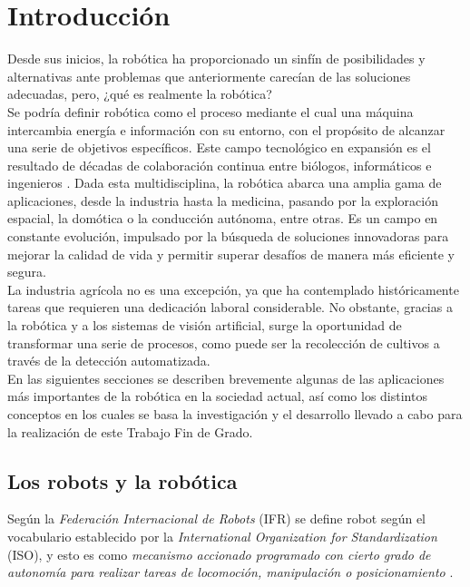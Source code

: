 \chapter{Introducción}
\label{cap:capitulo1}
\setcounter{page}{1}

Desde sus inicios, la robótica ha proporcionado un sinfín de posibilidades y alternativas ante problemas que anteriormente carecían de las soluciones adecuadas, pero, ¿qué es realmente la robótica?\\

Se podría definir robótica como el proceso mediante el cual una máquina intercambia energía e información con su entorno, con el propósito de alcanzar una serie de objetivos específicos. Este campo tecnológico en expansión es el resultado de décadas de colaboración continua entre biólogos, informáticos e ingenieros \cite{Koditschek21}. Dada esta multidisciplina, la robótica abarca una amplia gama de aplicaciones, desde la industria hasta la medicina, pasando por la exploración espacial, la domótica o la conducción autónoma, entre otras. Es un campo en constante evolución, impulsado por la búsqueda de soluciones innovadoras para mejorar la calidad de vida y permitir superar desafíos de manera más eficiente y segura.\\

La industria agrícola no es una excepción, ya que ha contemplado históricamente tareas que requieren una dedicación laboral considerable. No obstante, gracias a la robótica y a los sistemas de visión artificial, surge la oportunidad de transformar una serie de procesos, como puede ser la recolección de cultivos a través de la detección automatizada.\\

En las siguientes secciones se describen brevemente algunas de las aplicaciones más importantes de la robótica en la sociedad actual, así como los distintos conceptos en los cuales se basa la investigación y el desarrollo llevado a cabo para la realización de este Trabajo Fin de Grado.\\

\section{Los robots y la robótica}
\label{sec:robótica} %

Según la \textit{Federación Internacional de Robots} (IFR) se define robot según el vocabulario establecido por la \textit{International Organization for Standardization} (ISO), y esto es como \textit{mecanismo accionado programado con cierto grado de autonomía para realizar tareas de locomoción, manipulación o posicionamiento} \cite{ISO8373}.\\  

